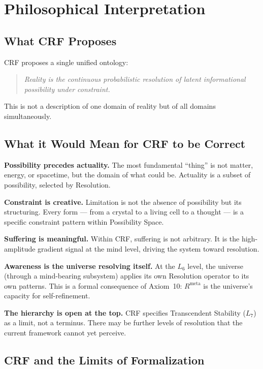\documentclass[12pt, a4paper]{article}
\begin{document}
\section{Philosophical Interpretation}

\subsection{What CRF Proposes}

CRF proposes a single unified ontology:
\begin{quote}
\textit{Reality is the continuous probabilistic resolution of latent informational
possibility under constraint.}
\end{quote}
This is not a description of one domain of reality but of all domains simultaneously.

\subsection{What it Would Mean for CRF to be Correct}

\textbf{Possibility precedes actuality.} The most fundamental ``thing'' is not matter,
energy, or spacetime, but the domain of what could be. Actuality is a subset of possibility,
selected by Resolution.

\textbf{Constraint is creative.} Limitation is not the absence of possibility but its
structuring. Every form --- from a crystal to a living cell to a thought --- is a specific
constraint pattern within Possibility Space.

\textbf{Suffering is meaningful.} Within CRF, suffering is not arbitrary. It is the
high-amplitude gradient signal at the mind level, driving the system toward resolution.

\textbf{Awareness is the universe resolving itself.} At the $L_6$ level, the universe
(through a mind-bearing subsystem) applies its own Resolution operator to its own patterns.
This is a formal consequence of Axiom~10: $R^{\mathrm{meta}}$ is the universe's capacity
for self-refinement.

\textbf{The hierarchy is open at the top.} CRF specifies Transcendent Stability ($L_7$) as
a limit, not a terminus. There may be further levels of resolution that the current framework
cannot yet perceive.

\subsection{CRF and the Limits of Formalization}
\end{document}
